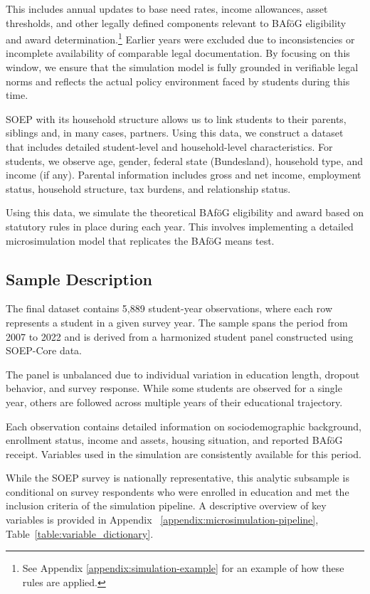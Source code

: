 This includes annual updates to base need rates, income allowances, asset thresholds, and other legally defined components relevant to BAföG eligibility and award determination.\footnote{
  See Appendix \ref{appendix:simulation-example} for an example of how these rules are applied.
}
Earlier years were excluded due to inconsistencies or incomplete availability of comparable legal documentation. 
By focusing on this window, we ensure that the simulation model is fully grounded in verifiable legal norms and reflects the actual policy environment faced by students during this time.

SOEP with its household structure allows us to link students to their parents, siblings and, in many cases, partners.
Using this data, we construct a dataset that includes detailed student-level and household-level characteristics. 
For students, we observe age, gender, federal state (Bundesland), household type, and income (if any). 
Parental information includes gross and net income, employment status, household structure, tax burdens, and relationship status. 

Using this data, we simulate the theoretical BAföG eligibility and award based on statutory rules in place during each year. 
This involves implementing a detailed microsimulation model that replicates the BAföG means test.

\subsection{Sample Description}
The final dataset contains 5,889 student-year observations, where each row represents a student in a given survey year. 
The sample spans the period from 2007 to 2022 and is derived from a harmonized student panel constructed using SOEP-Core data.

The panel is unbalanced due to individual variation in education length, dropout behavior, and survey response. 
While some students are observed for a single year, others are followed across multiple years of their educational trajectory.

Each observation contains detailed information on sociodemographic background, enrollment status, income and assets, housing situation, and reported BAföG receipt. Variables used in the simulation are consistently available for this period.

While the SOEP survey is nationally representative, this analytic subsample is conditional on survey respondents who were enrolled in education and met the inclusion criteria of the simulation pipeline. 
A descriptive overview of key variables is provided in Appendix ~\ref{appendix:microsimulation-pipeline}, Table~\ref{table:variable_dictionary}.

